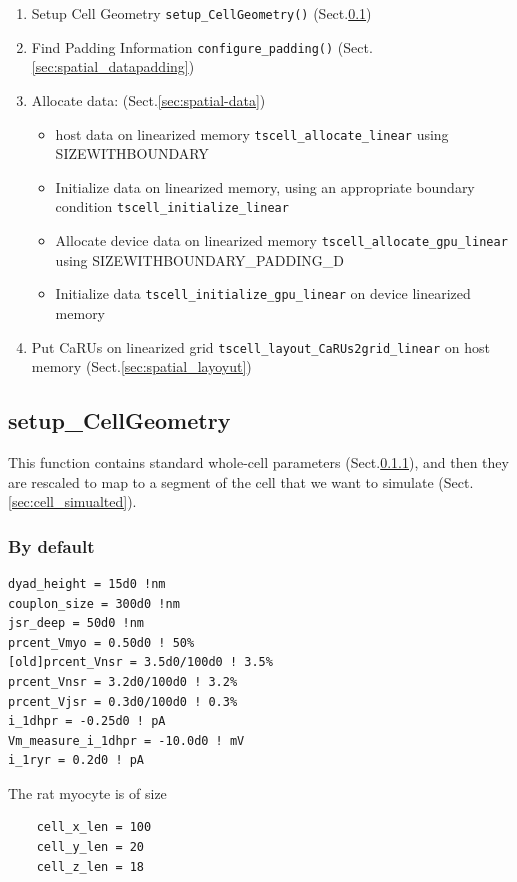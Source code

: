 \begin{enumerate}
\item Setup Cell Geometry \verb!setup_CellGeometry()! (Sect.\ref{sec:setup_cellgeometry})
\item Find Padding Information \verb!configure_padding()! (Sect.\ref{sec:spatial_datapadding})
\item Allocate data: (Sect.\ref{sec:spatial-data})
\begin{itemize}
  \item host data on linearized
memory \verb!tscell_allocate_linear! using SIZEWITHBOUNDARY
\item Initialize data on linearized memory, using an appropriate
  boundary condition \verb!tscell_initialize_linear!
\item Allocate device data on linearized memory
  \verb!tscell_allocate_gpu_linear! using SIZEWITHBOUNDARY\_PADDING\_D
\item Initialize data \verb!tscell_initialize_gpu_linear! on device
  linearized memory
\end{itemize} 
\item Put CaRUs on linearized grid
  \verb!tscell_layout_CaRUs2grid_linear! on host memory (Sect.\ref{sec:spatial_layoyut})
\end{enumerate}

\subsection{setup\_CellGeometry}
\label{sec:setup_cellgeometry}

This function contains standard whole-cell parameters
(Sect.\ref{sec:cell_default}), and then they are rescaled to map to a segment of
the cell that we want to simulate (Sect.\ref{sec:cell_simualted}).

\subsubsection{By default}
\label{sec:cell_default}

\begin{verbatim}
dyad_height = 15d0 !nm
couplon_size = 300d0 !nm
jsr_deep = 50d0 !nm
prcent_Vmyo = 0.50d0 ! 50%
[old]prcent_Vnsr = 3.5d0/100d0 ! 3.5%
prcent_Vnsr = 3.2d0/100d0 ! 3.2%
prcent_Vjsr = 0.3d0/100d0 ! 0.3%
i_1dhpr = -0.25d0 ! pA
Vm_measure_i_1dhpr = -10.0d0 ! mV
i_1ryr = 0.2d0 ! pA
\end{verbatim}

The rat myocyte is of size
\begin{verbatim}
    cell_x_len = 100
    cell_y_len = 20
    cell_z_len = 18
\end{verbatim}


